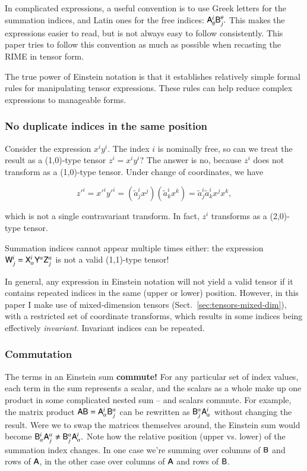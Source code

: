 \documentclass{aa}
\begin{document}
In complicated expressions, a useful convention is to use Greek letters for the summation indices, and Latin ones for the free indices:  $\mathsf{A}_{\theta}^{i}\mathsf{B}_{j}^{\theta}.$ This makes the expressions easier to read, but is not always easy to follow consistently. 
This paper tries to follow this convention as much as possible when recasting the RIME in tensor form.

The true power of Einstein notation is that it establishes relatively simple formal rules for manipulating tensor expressions. These rules
can help reduce complex expressions to manageable forms. 

\subsubsection{No duplicate indices in the same position}

Consider the expression $x^i y^i$. The index $i$ is nominally free, so can we treat the result as a (1,0)-type tensor $z^i = x^i y^i$? The answer is no, because $z^i$ does not transform as a (1,0)-type tensor. Under change of coordinates, we have

\[
  z'^i = x'^i y'^i = (\tilde a^i_j x^j) (\tilde a^i_k x^k) = \tilde a^i_j \tilde a^i_k x^j x^k, 
\]

which is not a single contravariant transform. In fact, $z^i$ transforms as a (2,0)-type tensor. 

Summation indices cannot appear multiple times either: the expression $\mathsf{W}^i_j = \mathsf{X}^i_\alpha \mathsf{Y}^\alpha \mathsf{Z}^\alpha_j$ is not a valid (1,1)-type tensor!

In general, any expression in Einstein notation will not yield a valid tensor if it contains repeated indices in the same (upper or lower) position. However, in this paper I make use of mixed-dimension tensors (Sect.~\ref{sec:tensors-mixed-dim}), with a restricted set of coordinate transforms, which results in some indices being effectively \emph{invariant}. Invariant indices can be repeated.

\subsubsection{Commutation}
\label{sec:einstein-commutation}
 
The terms in an Einstein sum \textbf{commute!} For any particular set of index values, each term in the sum represents a scalar, and the scalars as a whole make up one product in some complicated nested sum -- and scalars commute. For example, the matrix product $\mathsf{AB}=\mathsf{A}_\alpha^i \mathsf{B}_j^\alpha$ can be rewritten as $\mathsf{B}_{j}^{\alpha}\mathsf{A}_{\alpha}^{i}$ without changing the result. Were we to swap the matrices themselves around, the Einstein sum would become $\mathsf{B}_{\alpha}^{i}\mathsf{A}_{j}^{\alpha}\neq\mathsf{B}_{j}^{\alpha}\mathsf{A}_{\alpha}^{i}.$ Note how the relative position (upper vs. lower) of the summation index changes. In one case we're summing over columns of $\mathsf{B}$ and rows of $\mathsf{A}$, in the other case over columns of $\mathsf{A}$ and rows of $\mathsf{B}$. 
\end{document}
